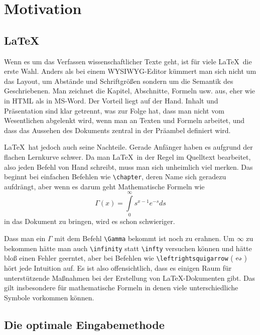 \chapter{Motivation}

\section{\LaTeX}

Wenn es um das Verfassen wissenschaftlicher Texte geht, ist für viele \LaTeX\ die erste Wahl. Anders als bei einem \ac{WYSIWYG}-Editor kümmert man sich nicht um das Layout, um Abstände und Schriftgrößen sondern um die Semantik des Geschriebenen. Man zeichnet die Kapitel, Abschnitte, Formeln usw. aus, eher wie in \ac{HTML} als in MS-Word. Der Vorteil liegt auf der Hand. Inhalt und Präsentation sind klar getrennt, was zur Folge hat, dass man nicht vom Wesentlichen abgelenkt wird, wenn man an Texten und Formeln arbeitet, und dass das Aussehen des Dokuments zentral in der Präambel definiert wird.

\LaTeX~hat jedoch auch seine Nachteile. Gerade Anfänger haben es aufgrund der flachen Lernkurve schwer. Da man \LaTeX~in der Regel im Quelltext bearbeitet, also jeden Befehl von Hand schreibt, muss man sich unheimlich viel merken. Das beginnt bei einfachen Befehlen wie \texttt{\textbackslash chapter}, deren Name sich geradezu aufdrängt, aber wenn es darum geht Mathematische Formeln wie $$\Gamma \left( x \right) = \int\limits_0^\infty  {s^{x - 1} e^{ - s} ds}$$ in das Dokument zu bringen, wird es schon schwieriger.

Dass man ein $\Gamma$ mit dem Befehl \texttt{\textbackslash Gamma} bekommt ist noch zu erahnen. Um $\infty$ zu bekommen hätte man auch \texttt{\textbackslash infinity} statt \texttt{\textbackslash infty} versuchen können und hätte bloß einen Fehler geerntet, aber bei Befehlen wie \texttt{\textbackslash leftrightsquigarrow} ($\leftrightsquigarrow$) hört jede Intuition auf. Es ist also offensichtlich, dass es einigen Raum für unterstützende Maßnahmen bei der Erstellung von \LaTeX-Dokumenten gibt. Das gilt insbesondere für mathematische Formeln in denen viele unterschiedliche Symbole vorkommen können.

\section{Die optimale Eingabemethode}
\label{sec:optimal}


